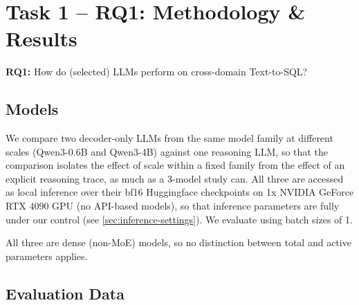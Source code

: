 \section{Task 1 -- RQ1: Methodology \& Results}
\label{sec:rq1-methods}

\textbf{RQ1:} How do (selected) LLMs perform on cross-domain Text-to-SQL?


\subsection{Models}
\label{sec:models}

We compare two decoder-only LLMs from the same model family at different scales (Qwen3-0.6B and Qwen3-4B) against one reasoning LLM, so that the comparison isolates the effect of scale within a fixed family from the effect of an explicit reasoning trace, as much as a 3-model study can. All three are accessed as local inference over their bf16 Huggingface checkpoints on 1x NVIDIA GeForce RTX 4090 GPU (no API-based models), so that inference parameters are fully under our control (see \ref{sec:inference-settings}). We evaluate using batch sizes of 1.

\begin{table}[H]
\centering
\footnotesize
\caption{Models compared in RQ1.}
\label{tab:models}
\end{table}

All three are dense (non-MoE) models, so no distinction between total and active parameters applies.

\subsection{Evaluation Data}
\label{sec:eval-data}

